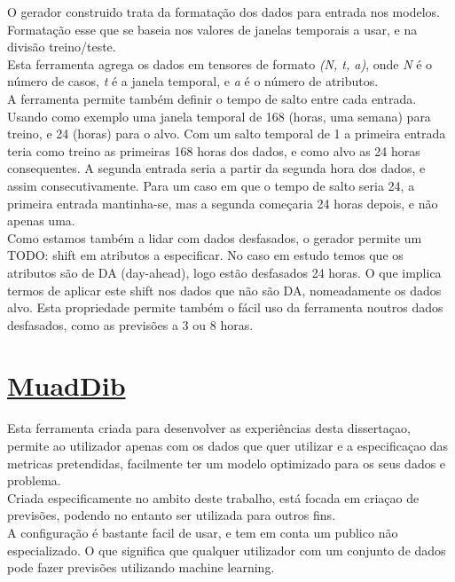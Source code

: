 O gerador construido trata da formatação dos dados para entrada nos modelos. Formatação esse que se baseia nos valores de janelas temporais a usar, e na divisão treino/teste.\\
Esta ferramenta agrega os dados em tensores de formato \textit{(N, t, a)}, onde \textit{N} é o número de casos, \textit{t} é a janela temporal, e \textit{a} é o número de atributos.\\
A ferramenta permite também definir o tempo de salto entre cada entrada.\\
Usando como exemplo uma janela temporal de 168 (horas, uma semana) para treino, e 24 (horas) para o alvo. Com um salto temporal de 1 a primeira entrada teria como treino as primeiras 168 horas dos dados, e como alvo as 24 horas consequentes. A segunda entrada seria a partir da segunda hora dos dados, e assim consecutivamente. Para um caso em que o tempo de salto seria 24, a primeira entrada mantinha-se, mas a segunda começaria 24 horas depois, e não apenas uma.\\

Como estamos também a lidar com dados desfasados, o gerador permite um TODO: shift em atributos a especificar. No caso em estudo temos que os atributos são de DA (day-ahead), logo estão desfasados 24 horas. O que implica termos de aplicar este shift nos dados que não são DA, nomeadamente os dados alvo. Esta propriedade permite também o fácil uso da ferramenta noutros dados desfasados, como as previsões a 3 ou 8 horas.\\

\section{\href{https://github.com/alquimodelia/MuadDib}{MuadDib}\label{se:muaddib}}

Esta ferramenta criada para desenvolver as experiências desta dissertaçao, permite ao utilizador apenas com os dados que quer utilizar e a especificaçao das metricas pretendidas, facilmente ter um modelo optimizado para os seus dados e problema. \\
Criada especificamente no ambito deste trabalho, está focada em criaçao de previsões, podendo no entanto ser utilizada para outros fins. \\
A configuração é bastante facil de usar, e tem em conta um publico não especializado. O que significa que qualquer utilizador com um conjunto de dados pode fazer previsões utilizando machine learning.

